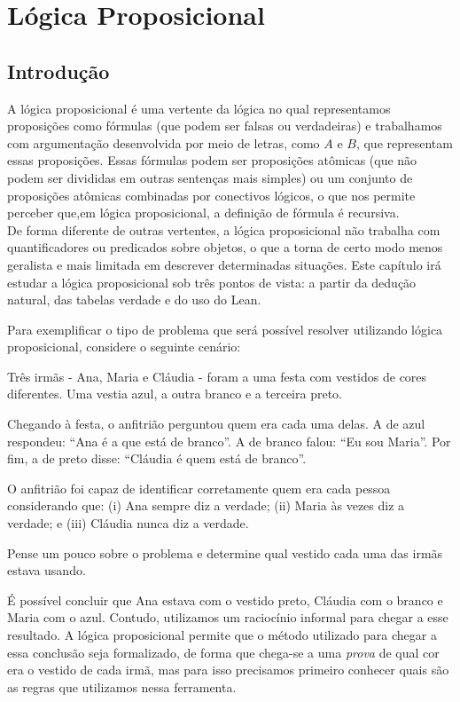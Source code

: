 \chapter{Lógica Proposicional}
\section{Introdução}

A lógica proposicional é uma vertente da lógica no qual representamos proposições como fórmulas (que podem ser falsas ou verdadeiras) e trabalhamos com argumentação desenvolvida por meio de letras, como $A$ e $B$, que representam essas proposições. Essas fórmulas podem ser proposições atômicas (que não podem ser divididas em outras sentenças mais simples) ou um conjunto de proposições atômicas combinadas por conectivos lógicos, o que nos permite perceber que,em lógica proposicional, a definição de fórmula é recursiva.\\
De forma diferente de outras vertentes, a lógica proposicional não trabalha com quantificadores ou predicados sobre objetos, o que a torna de certo modo menos geralista e mais limitada em descrever determinadas situações.
Este capítulo irá estudar a lógica proposicional sob três pontos de vista: a partir da dedução natural, das tabelas verdade e do uso do Lean. 

Para exemplificar o tipo de problema que será possível resolver utilizando lógica proposicional, considere o seguinte cenário:

\bigbreak
Três irmãs - Ana, Maria e Cláudia - foram a uma festa com vestidos de cores diferentes. Uma vestia azul, a outra branco e a terceira
preto. 

Chegando à festa, o anfitrião perguntou quem era cada uma
delas. A de azul respondeu: ``Ana é a que está de branco”. A de branco falou: ``Eu sou Maria”. Por fim, a de preto disse:  ``Cláudia é quem está de branco”.

O anfitrião foi capaz de identificar corretamente quem era cada pessoa considerando que: (i) Ana sempre diz a verdade; (ii) Maria às vezes diz a verdade; e (iii) Cláudia nunca diz a verdade.

Pense um pouco sobre o problema e determine qual vestido cada uma das irmãs estava usando. 
\bigbreak

É possível concluir que Ana estava com o vestido preto, Cláudia com o branco e Maria com o azul. Contudo, utilizamos um raciocínio informal para chegar a esse resultado. A lógica proposicional permite que o método utilizado para chegar a essa conclusão seja formalizado, de forma que chega-se a uma  \textit{prova} de qual cor era o vestido de cada irmã, mas para isso precisamos primeiro conhecer quais são as regras que utilizamos nessa ferramenta.

